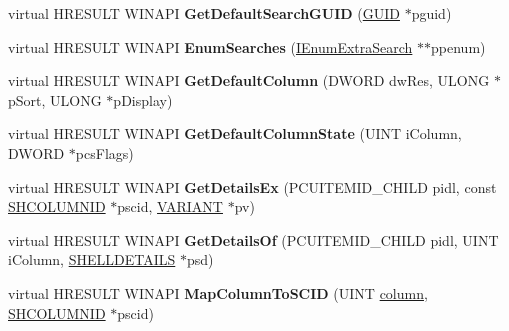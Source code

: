 \begin{DoxyCompactItemize}
\item 
\mbox{\label{class_c_recycle_bin_a78d0766b6dde2b102909123d89bf0fd4}} 
virtual H\+R\+E\+S\+U\+LT W\+I\+N\+A\+PI {\bfseries Get\+Default\+Search\+G\+U\+ID} (\hyperlink{interface_g_u_i_d}{G\+U\+ID} $\ast$pguid)
\item 
\mbox{\label{class_c_recycle_bin_a8188e0db374ec360ec7c04302ee1e5ed}} 
virtual H\+R\+E\+S\+U\+LT W\+I\+N\+A\+PI {\bfseries Enum\+Searches} (\hyperlink{interface_i_enum_extra_search}{I\+Enum\+Extra\+Search} $\ast$$\ast$ppenum)
\item 
\mbox{\label{class_c_recycle_bin_a1503ed14f2bb31616c41221c0e8e1f77}} 
virtual H\+R\+E\+S\+U\+LT W\+I\+N\+A\+PI {\bfseries Get\+Default\+Column} (D\+W\+O\+RD dw\+Res, U\+L\+O\+NG $\ast$p\+Sort, U\+L\+O\+NG $\ast$p\+Display)
\item 
\mbox{\label{class_c_recycle_bin_a8894feb7ce1e025b72a4e850ed8bb139}} 
virtual H\+R\+E\+S\+U\+LT W\+I\+N\+A\+PI {\bfseries Get\+Default\+Column\+State} (U\+I\+NT i\+Column, D\+W\+O\+RD $\ast$pcs\+Flags)
\item 
\mbox{\label{class_c_recycle_bin_a5ae521e9d9144284d8f2aac02b8f850d}} 
virtual H\+R\+E\+S\+U\+LT W\+I\+N\+A\+PI {\bfseries Get\+Details\+Ex} (P\+C\+U\+I\+T\+E\+M\+I\+D\+\_\+\+C\+H\+I\+LD pidl, const \hyperlink{struct_i_shell_folder2_1_1_s_h_c_o_l_u_m_n_i_d}{S\+H\+C\+O\+L\+U\+M\+N\+ID} $\ast$pscid, \hyperlink{structtag_v_a_r_i_a_n_t}{V\+A\+R\+I\+A\+NT} $\ast$pv)
\item 
\mbox{\label{class_c_recycle_bin_aa007565c36521ef36b2e2b46f60a95eb}} 
virtual H\+R\+E\+S\+U\+LT W\+I\+N\+A\+PI {\bfseries Get\+Details\+Of} (P\+C\+U\+I\+T\+E\+M\+I\+D\+\_\+\+C\+H\+I\+LD pidl, U\+I\+NT i\+Column, \hyperlink{struct_s_h_e_l_l_d_e_t_a_i_l_s}{S\+H\+E\+L\+L\+D\+E\+T\+A\+I\+LS} $\ast$psd)
\item 
\mbox{\label{class_c_recycle_bin_a01f45bdc293fc0b78e1577012af1dd59}} 
virtual H\+R\+E\+S\+U\+LT W\+I\+N\+A\+PI {\bfseries Map\+Column\+To\+S\+C\+ID} (U\+I\+NT \hyperlink{structcolumn}{column}, \hyperlink{struct_i_shell_folder2_1_1_s_h_c_o_l_u_m_n_i_d}{S\+H\+C\+O\+L\+U\+M\+N\+ID} $\ast$pscid)
$$
\end{DoxyCompactItemize}
